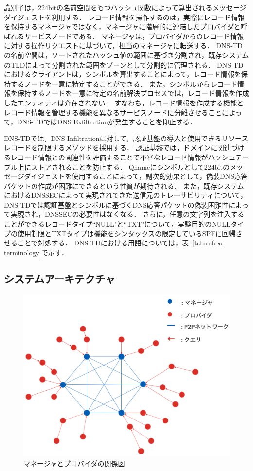識別子は，224bitの名前空間をもつハッシュ関数によって算出されるメッセージダイジェストを利用する．
レコード情報を操作するのは，実際にレコード情報を保持するマネージャではなく，マネージャに階層的に連結したプロバイダと呼ばれるサービスノードである．
マネージャは，プロバイダからのレコード情報に対する操作リクエストに基づいて，担当のマネージャに転送する．
DNS-TDの名前空間は，ソートされたハッシュ値の範囲に基づき分割され，既存システムのTLDによって分割された範囲をゾーンとして分割的に管理される．
DNS-TDにおけるクライアントは，シンボルを算出することによって，レコード情報を保持するノードを一意に特定することができる．
また，シンボルからレコード情報を保持するノードを一意に特定の名前解決プロセスでは，レコード情報を作成したエンティティは介在されない．
すなわち，レコード情報を作成する機能とレコード情報を管理する機能を異なるサービスノードに分離させることによって，DNS-TDではDNS Exfiltrationが発生することを抑止する．

DNS-TDでは，DNS Infiltrationに対して，認証基盤の導入と使用できるリソースレコードを制限するメソッドを採用する．
認証基盤では，ドメインに関連づけるレコード情報との関連性を評価することで不審なレコード情報がハッシュテーブル上にストアされることを防止する．
Qnameにシンボルとして224bitのメッセージダイジェストを使用することによって，副次的効果として，偽装DNS応答パケットの作成が困難にできるという性質が期待される．
また，既存システムにおけるDNSSECによって実現されてきた送信元のトレーサビリティについて，DNS-TDでは認証基盤とシンボルに基づくDNS応答パケットの偽装困難性によって実現され，DNSSECの必要性はなくなる．
さらに，任意の文字列を注入することができるレコードタイプ``NULL"と``TXT"について，実験目的のNULLタイプの使用制限とTXTタイプは機能をシンタックスの限定しているSPFに回帰させることで対処する．
DNS-TDにおける用語については，表~\ref{tab:refres-terminology}で示す．


\newpage
\subsection{システムアーキテクチャ}
\begin{figure}[htbp]
 \centering
 \includegraphics[scale=0.5]{figure/manager-provider.png}
 \caption{マネージャとプロバイダの関係図}
 \label{fig:manager-provider}
\end{figure}

